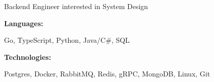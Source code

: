 \documentclass[9pt]{developercv} %
\begin{document}
\begin{minipage}[t]{0.46\textwidth}
	\vspace{-6pt}
Backend Engineer interested in System Design
\end{minipage}
\hfill %
\begin{minipage}[t]{0.465\textwidth}
    \vspace{-6pt}
    
    \begin{minipage}[t]{0.2\textwidth}
        \textbf{Languages:}
    \end{minipage}
    \hfill
    \begin{minipage}[t]{0.73\textwidth}
      Go, TypeScript, Python, Java/C#, SQL
    \end{minipage}
    \vspace{4mm}
    
    \begin{minipage}[t]{0.2\textwidth}
        \textbf{Technologies:}
    \end{minipage}
    \hfill
    \begin{minipage}[t]{0.73\textwidth}
      Postgres, Docker, RabbitMQ, Redis, gRPC, MongoDB, Linux, Git
    \end{minipage}
    
\end{minipage}
\end{document}
